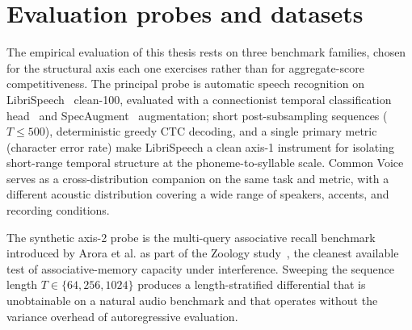   \section{Evaluation probes and datasets}

  The empirical evaluation of this thesis rests on three benchmark
  families, chosen for the structural axis each one exercises
  rather than for aggregate-score competitiveness. The principal
  probe is automatic speech recognition on
  LibriSpeech~\cite{panayotov2015librispeech} clean-100, evaluated
  with a connectionist temporal classification
  head~\cite{graves2006ctc} and SpecAugment~\cite{park2019specaugment}
  augmentation; short post-subsampling sequences ($T \le 500$),
  deterministic greedy CTC decoding, and a single primary metric
  (character error rate) make LibriSpeech a clean axis-1
  instrument for isolating short-range temporal structure at the
  phoneme-to-syllable scale. Common
  Voice~\cite{ardila2019commonvoice} serves as a cross-distribution
  companion on the same task and metric, with a different acoustic
  distribution covering a wide range of speakers, accents, and
  recording conditions.

  The synthetic axis-2 probe is the multi-query associative recall
  benchmark introduced by Arora et al. as part of the Zoology
  study~\cite{arora2023zoology}, the cleanest available test of
  associative-memory capacity under interference. Sweeping the
  sequence length $T \in \{64, 256, 1024\}$ produces a
  length-stratified differential that is unobtainable on a
  natural audio benchmark and that operates without the variance
  overhead of autoregressive evaluation.

